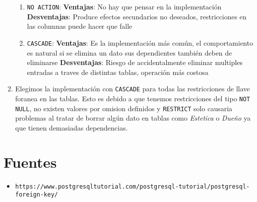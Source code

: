 \documentclass{exam}
\begin{document}
\begin{enumerate}
\begin{enumerate}
			\item \texttt{NO ACTION}: \textbf{Ventajas}: No hay que pensar en la implementación \textbf{Desventajas}: Produce efectos secundarios no deseados, restricciones en las columnas puede hacer que falle
			\item \texttt{CASCADE}: \textbf{Ventajas}: Es la implementación más común, el comportamiento es natural si se elimina un dato sus dependientes también deben de eliminarse \textbf{Desventajas}: Riesgo de accidentalmente eliminar multiples entradas a traves de distintas tablas, operación más costosa
		\end{enumerate}
		\item Elegimos la implementación con \texttt{CASCADE} para todas las restricciones de llave foranea en las tablas. Esto es debido a que tenemos restricciones del tipo \texttt{NOT NULL}, no existen valores por omision definidos y \texttt{RESTRICT} solo causaria problemas al tratar de borrar algún dato en tablas como \textit{Estetica} o \textit{Dueño} ya que tienen demasiadas dependencias.
	\end{enumerate}

\section*{Fuentes}

\begin{itemize}
	\item \texttt{https://www.postgresqltutorial.com/postgresql-tutorial/postgresql-foreign-key/}
\end{itemize}
\end{document}
